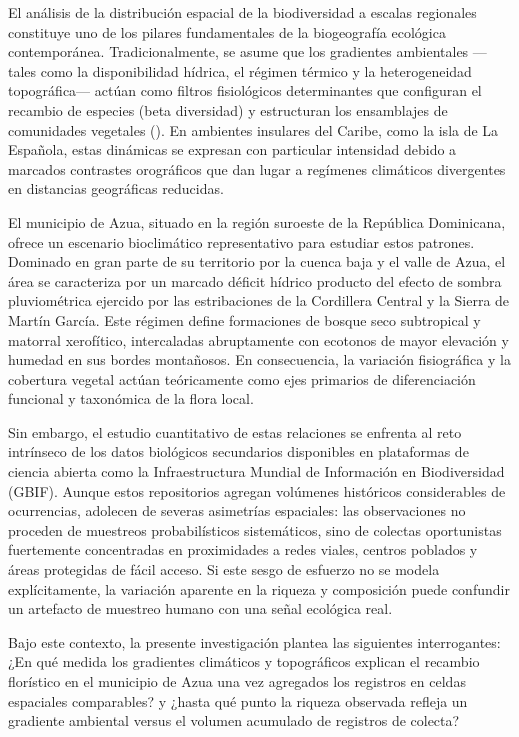 \documentclass[
  12pt,
  man,
  floatsintext]{apa7}
\begin{document}
El análisis de la distribución espacial de la biodiversidad a escalas regionales constituye uno de los pilares fundamentales de la biogeografía ecológica contemporánea. Tradicionalmente, se asume que los gradientes ambientales ---tales como la disponibilidad hídrica, el régimen térmico y la heterogeneidad topográfica--- actúan como filtros fisiológicos determinantes que configuran el recambio de especies (beta diversidad) y estructuran los ensamblajes de comunidades vegetales (). En ambientes insulares del Caribe, como la isla de La Española, estas dinámicas se expresan con particular intensidad debido a marcados contrastes orográficos que dan lugar a regímenes climáticos divergentes en distancias geográficas reducidas.

El municipio de Azua, situado en la región suroeste de la República Dominicana, ofrece un escenario bioclimático representativo para estudiar estos patrones. Dominado en gran parte de su territorio por la cuenca baja y el valle de Azua, el área se caracteriza por un marcado déficit hídrico producto del efecto de sombra pluviométrica ejercido por las estribaciones de la Cordillera Central y la Sierra de Martín García. Este régimen define formaciones de bosque seco subtropical y matorral xerofítico, intercaladas abruptamente con ecotonos de mayor elevación y humedad en sus bordes montañosos. En consecuencia, la variación fisiográfica y la cobertura vegetal actúan teóricamente como ejes primarios de diferenciación funcional y taxonómica de la flora local.

Sin embargo, el estudio cuantitativo de estas relaciones se enfrenta al reto intrínseco de los datos biológicos secundarios disponibles en plataformas de ciencia abierta como la Infraestructura Mundial de Información en Biodiversidad (GBIF). Aunque estos repositorios agregan volúmenes históricos considerables de ocurrencias, adolecen de severas asimetrías espaciales: las observaciones no proceden de muestreos probabilísticos sistemáticos, sino de colectas oportunistas fuertemente concentradas en proximidades a redes viales, centros poblados y áreas protegidas de fácil acceso. Si este sesgo de esfuerzo no se modela explícitamente, la variación aparente en la riqueza y composición puede confundir un artefacto de muestreo humano con una señal ecológica real.

Bajo este contexto, la presente investigación plantea las siguientes interrogantes: ¿En qué medida los gradientes climáticos y topográficos explican el recambio florístico en el municipio de Azua una vez agregados los registros en celdas espaciales comparables? y ¿hasta qué punto la riqueza observada refleja un gradiente ambiental versus el volumen acumulado de registros de colecta?
\end{document}
